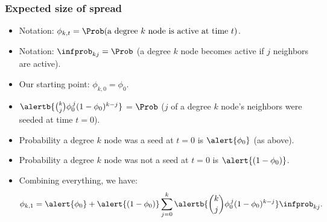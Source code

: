 \begin{frame}
  \small

  \frametitle{Expected size of spread}

  \begin{block}{}
  \begin{itemize}
  \item<1->
    \alert{Notation:}
    $ \phi_{k,t} = 
    \Prob(\mbox{a degree $k$ node is active at time $t$}) $.
  \item<2->
    \alert{Notation:}
    $\infprob_{k j} = \Prob$ (a degree $k$ node becomes active
    if $j$ neighbors are active).
  \item<3-> 
    Our starting point: $ \phi_{k,0} = \phi_0$.
  \item<4->
    $ 
    \alertb{\binom{k}{j}
      \phi_0^{\, j}
      (1-\phi_0)^{k-j} }
    $ 
    =
    $\Prob$ ($j$ of a degree $k$ node's neighbors were seeded at time $t=0$).
  \item<5-> 
    Probability a degree $k$ node was a seed at $t=0$ is $\alert{\phi_0}$ (as above).
  \item<6-> 
    Probability a degree $k$ node was not a seed at $t=0$ is $\alert{(1-\phi_0)}$.
  \item<7-> 
    Combining everything, we have:
    $$ 
    \phi_{k,1}
    = 
    \alert{\phi_{0}}
    + 
    \alert{(1-\phi_{0})}
    \sum_{j=0}^{k}
    \alertb{\binom{k}{j}
    \phi_0^{\, j}
    (1-\phi_0)^{k-j} }
  \infprob_{k j}.
    $$
  \end{itemize}
  \end{block}

\end{frame}

